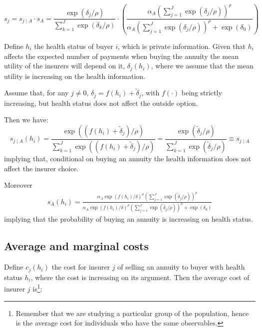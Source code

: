 \documentclass[12pt]{article}
\theoremstyle{plain}
\theoremstyle{plain}
\begin{document}
\begin{equation}\label{eq:choice_prob}
    s_j = s_{j\mid A} \cdot s_A = 
    \frac{\exp(\delta_{j} / \rho)}{\sum_{k=1}^{J} \exp(\delta_{k} / \rho)}  \cdot \left( \frac{\alpha_A\left(\sum_{j=1}^J \exp(\delta_j/\rho)\right)^\rho }{\alpha_A\left(\sum_{j=1}^J \exp(\delta_j/\rho)\right)^\rho +  \exp \left(\delta_0 \right)}\right)
\end{equation}

Define $h_i$ the health status of buyer $i$, which is private information. Given that $h_i$ affects the expected number of payments when buying the annuity the mean utility of the insurers will depend on it, $\delta_j(h_i)$, where we assume that the mean utility is increasing on the health information. 

Assume that, for any $j\neq 0$,  $\delta_j = f(h_i) + \tilde{\delta}_j$, with $f(\cdot)$ being strictly increasing,  but health status does not affect the outside option. 


Then we have:
\begin{equation}\label{eq:no_selection}
    s_{j\mid A}(h_i) = \frac{\exp((f(h_i) + \tilde{\delta}_j) / \rho)}{\sum_{k=1}^{J} \exp((f(h_i) + \tilde{\delta}_j)/ \rho)} = \frac{\exp( \tilde{\delta}_j / \rho)}{\sum_{k=1}^{J} \exp( \tilde{\delta}_j/ \rho)} \equiv s_{j\mid A}
\end{equation}
implying that, conditional on buying an annuity the health information does not affect the insurer choice. 
 

Moreover 
\begin{align}\label{eq:into_selection}
    s_A(h_i)
    = \frac{\alpha_A\exp(f(h_i)/\delta)^\rho\left(\sum_{j=1}^J \exp(\tilde{\delta}_j/\rho)\right)^\rho }{\alpha_A\exp(f(h_i)/\delta)^\rho\left(\sum_{j=1}^J \exp(\tilde{\delta}_j/\rho)\right)^\rho  +  \exp \left(\delta_0 \right)}
\end{align}
implying that the probability of buying an annuity is increasing on health status. 


\subsection{Average and marginal costs}\label{sec:costs}

Define $c_j(h_i)$ the cost for insurer $j$ of selling an annuity to buyer with health status $h_i$, where the cost is increasing on its argument.  Then the average cost of insurer $j$ is\footnote{Remember that we are studying a particular group of the population, hence is the average cost for individuals who have the same observables. }: 
\end{document}
